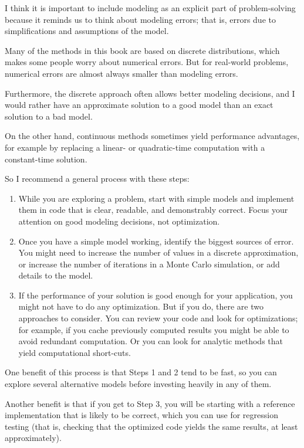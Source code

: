 \documentclass[12pt]{book}
\begin{document}
I think it is important to include modeling as an explicit part
of problem-solving because it reminds us to think about modeling
errors; that is, errors due to simplifications and assumptions
of the model.

Many of the methods in this book are based on discrete distributions,
which makes some people worry about numerical errors.  But for
real-world problems, numerical errors are almost always
smaller than modeling errors.

Furthermore, the discrete approach often allows better modeling
decisions, and I would rather have an approximate solution
to a good model than an exact solution to a bad model.

On the other hand, continuous methods sometimes yield performance
advantages, for example by replacing a linear- or quadratic-time
computation with a constant-time solution.

So I recommend a general process with these steps:

\begin{enumerate}

\item While you are exploring a problem, start with simple models and
  implement them in code that is clear, readable, and demonstrably
  correct.  Focus your attention on good modeling decisions, not
  optimization.

\item Once you have a simple model working, identify the
  biggest sources of error.  You might need to increase the number of
  values in a discrete approximation, or increase the number of
  iterations in a Monte Carlo simulation, or add details to the model.

\item If the performance of your solution is good enough for your
  application, you might not have to do any optimization.  But if you
  do, there are two approaches to consider.  You can review your code
  and look for optimizations; for example, if you cache previously
  computed results you might be able to avoid redundant computation.
  Or you can look for analytic methods that yield computational
  short-cuts.

\end{enumerate}

One benefit of this process is that Steps 1 and 2 tend to be fast, so you
can explore several alternative models before investing heavily in any
of them.

Another benefit is that if you get to Step 3, you will be starting
with a reference implementation that is likely to be correct,
which you can use for regression testing (that is, checking that the
optimized code yields the same results, at least approximately).
\end{document}
